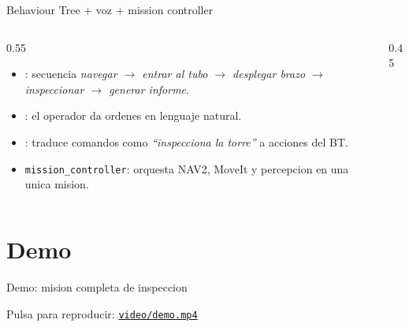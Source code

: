 \documentclass[10pt,aspectratio=169]{beamer}
\begin{document}
\begin{frame}{Behaviour Tree + voz + mission controller}
  \begin{columns}
    \begin{column}{0.55\textwidth}
      \begin{itemize}
        \item {}: secuencia \emph{navegar $\to$ entrar al tubo $\to$ desplegar brazo $\to$ inspeccionar $\to$ generar informe}.
        \item {}: el operador da ordenes en lenguaje natural.
        \item {}: traduce comandos como \emph{``inspecciona la torre''} a acciones del BT.
        \item \texttt{mission\_controller}: orquesta NAV2, MoveIt y percepcion en una unica mision.
      \end{itemize}
    \end{column}
    \begin{column}{0.45\textwidth}
    \end{column}
  \end{columns}
\end{frame}

\section{Demo}

\begin{frame}{Demo: mision completa de inspeccion}
  \begin{center}
    \vspace{-0.5em}
    {\small Pulsa para reproducir: \href{run:video/demo.mp4}{\texttt{video/demo.mp4}}}
  \end{center}
\end{frame}

\end{document}
